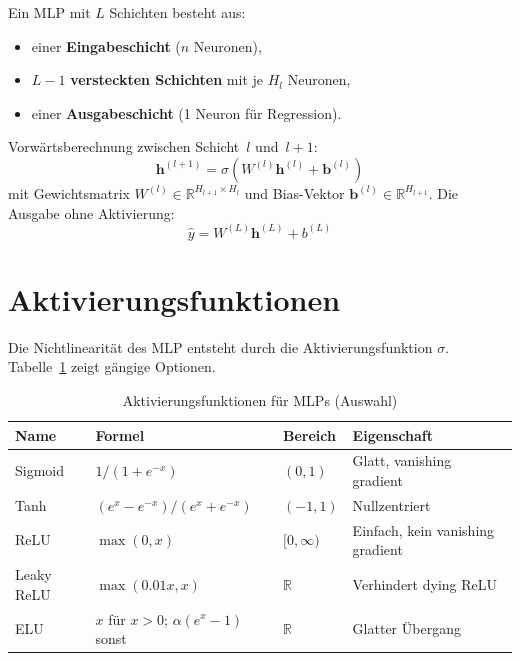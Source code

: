 \documentclass[11pt,a4paper]{report}
\begin{document}
Ein MLP mit $L$ Schichten besteht aus:
\begin{itemize}
\item einer \textbf{Eingabeschicht} ($n$ Neuronen),
\item $L{-}1$ \textbf{versteckten Schichten} mit je $H_l$ Neuronen,
\item einer \textbf{Ausgabeschicht} (1 Neuron f\"{u}r Regression).
\end{itemize}

Vorw\"{a}rtsberechnung zwischen Schicht~$l$ und~$l{+}1$:
\begin{equation}
\mathbf{h}^{(l+1)} = \sigma\!\left(W^{(l)}\mathbf{h}^{(l)} + \mathbf{b}^{(l)}\right)
\label{eq:mlp_forward}
\end{equation}
mit Gewichtsmatrix $W^{(l)} \in \mathbb{R}^{H_{l+1} \times H_l}$ und Bias-Vektor
$\mathbf{b}^{(l)} \in \mathbb{R}^{H_{l+1}}$. Die Ausgabe ohne Aktivierung:
\begin{equation}
\hat{y} = W^{(L)}\mathbf{h}^{(L)} + b^{(L)}
\label{eq:mlp_output}
\end{equation}

\section{Aktivierungsfunktionen}

Die Nichtlinearit\"{a}t des MLP entsteht durch die Aktivierungsfunktion $\sigma$.
Tabelle~\ref{tab:activation_functions} zeigt g\"{a}ngige Optionen.

\begin{table}[H]
\centering
\caption{Aktivierungsfunktionen f\"{u}r MLPs (Auswahl)}
\label{tab:activation_functions}
\begin{tabular}{p{2.5cm}p{5.5cm}p{2.5cm}p{3.0cm}}
\toprule
\textbf{Name} & \textbf{Formel} & \textbf{Bereich} & \textbf{Eigenschaft} \\
\midrule
Sigmoid     & $1/(1+e^{-x})$              & $(0,1)$      & Glatt, vanishing gradient \\
Tanh        & $(e^x-e^{-x})/(e^x+e^{-x})$ & $(-1,1)$    & Nullzentriert \\
ReLU        & $\max(0, x)$                 & $[0,\infty)$ & Einfach, kein vanishing gradient \\
Leaky ReLU  & $\max(0.01x, x)$             & $\mathbb{R}$ & Verhindert dying ReLU \\
ELU         & $x$ f\"{u}r $x>0$; $\alpha(e^x{-}1)$ sonst & $\mathbb{R}$ & Glatter \"{U}bergang \\
\bottomrule
\end{tabular}
\end{table}
\end{document}

